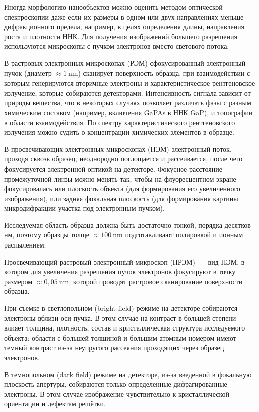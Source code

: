 Иногда морфологию нанообъектов можно оценить методом оптической спектроскопии даже если их размеры в одном или двух направлениях меньше дифракционного предела, например, в целях определения длины, направления роста и плотности ННК. Для получения изображений большего разрешения используются микроскопы с пучком электронов вместо светового потока.

В растровых электронных микроскопах (РЭМ) сфокусированный электронный пучок (диаметр \(\approx 1~\si{\nano\meter}\)) сканирует поверхность образца, при взаимодействии с которым генерируются вторичные электроны и характеристическое рентгеновское излучение, которые собираются детекторами. Интенсивность сигнала зависит от природы вещества, что в некоторых случаях позволяет различать фазы с разным химическим составом (например, включения GaPAs в ННК GaP), и топографии в области взаимодействия. По спектру характеристического рентгеновского излучения можно судить о концентрации химических элементов в образце.

В просвечивающих электронных микроскопах (ПЭМ) электронный поток, проходя сквозь образец, неоднородно поглощается и рассеивается, после чего фокусируется электронной оптикой на детекторе. Фокусное расстояние промежуточной линзы можно менять так, чтобы на флуоресцентном экране фокусировалась или плоскость объекта (для формирования его увеличенного изображения), или задняя фокальная плоскость (для формирования картины микродифракции участка под электронным пучком).

Исследуемая область образца должна быть достаточно тонкой, порядка десятков нм, поэтому образцы толще \(\approx 100~\si{\nano\meter}\) подготавливают полировкой и ионным распылением.

Просвечивающий растровый электронный микроскоп (ПРЭМ)~--- вид ПЭМ, в котором для увеличения разрешения пучок электронов фокусируют в точку размером \(\approx 0,05~\si{\nano\meter}\), которой проводят растровое сканирование поверхности образца.

При съемке в светлопольном (bright field) режиме на детекторе собираются электроны вблизи оси пучка. В этом случае на контраст в большей степени влияет толщина, плотность, состав и кристаллическая структура исследуемого объекта: области с большей толщиной и большим атомным номером имеют темный контраст из-за неупругого рассеяния проходящих через образец электронов.

В темнопольном (dark field) режиме на детекторе, из-за введенной в фокальную плоскость апертуры, собираются только определенные дифрагированные электроны. В этом случае изображение чувствительно к кристаллической ориентации и дефектам решётки.

